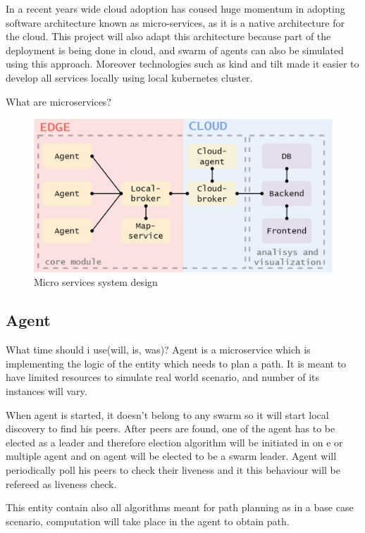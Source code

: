 In a recent years wide cloud adoption has coused huge momentum in adopting software architecture known as micro-services, as it is a native architecture for the cloud. This project will also adapt this architecture because part of the deployment is being done in cloud, and swarm of agents can also be simulated using this approach. Moreover technologies such as kind and tilt made it easier to develop all services locally using local kubernetes cluster.

{\color{red}What are microservices?}

\begin{figure}[H]
    \centering
    \includegraphics[width=\textwidth]{pictures/services.png}
    \caption{ Micro services system design }
    \label{fig:micro_services}
\end{figure}

\subsection{Agent}
{\color{red}What time should i use(will, is, was)?}
Agent is a microservice which is implementing the logic of the entity which needs to plan a path.  It is meant to have limited resources to simulate real world scenario, and number of its instances will vary.

When agent is started, it doesn't belong to any swarm so it will start local discovery to find his peers. After peers are found, one of the agent has to be elected as a leader and therefore election algorithm will be initiated in on e or multiple agent and on agent will be elected to be a swarm leader. Agent will periodically poll his peers to check their liveness and it this behaviour will be refereed as liveness check.

This entity contain also all algorithms meant for path planning as in a base case scenario, computation will take place in the agent to obtain path.

